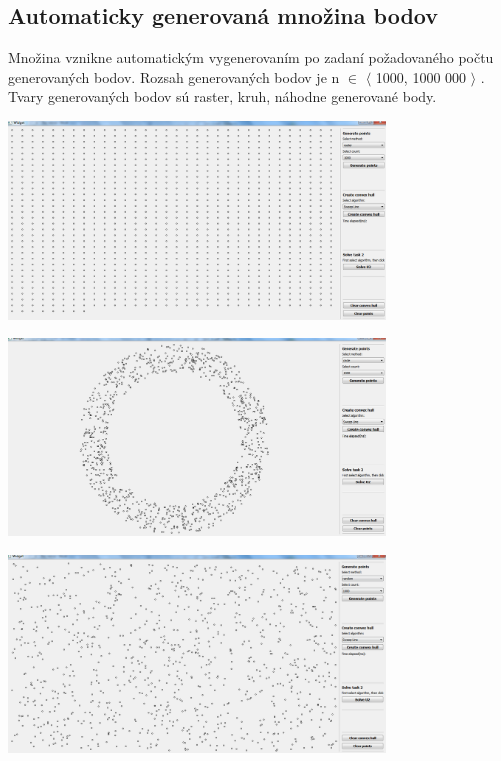 \documentclass[12pt]{article}
\begin{document}
\subsection{Automaticky generovaná množina bodov}
Množina vznikne automatickým vygenerovaním po zadaní požadovaného počtu generovaných bodov. Rozsah generovaných bodov je  n $\in$ $\langle$ 1000, 1000 000 $\rangle$ . Tvary generovaných bodov sú raster, kruh, náhodne generované body.

\begin{center}
   \includegraphics[width=10cm]{./img/points_generate_grid_1000.png}
\end{center}

\begin{center}
   \includegraphics[width=10cm]{./img/points_generate_circle_1000.png}
\end{center}

\begin{center}
   \includegraphics[width=10cm]{./img/points_generate_random_1000.png}
\end{center}
\end{document}
